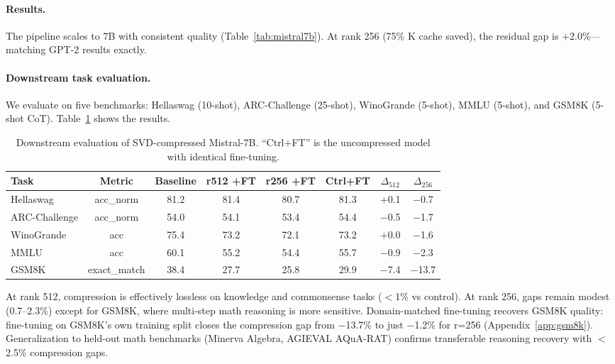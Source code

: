 \documentclass{article} %
\begin{document}
\paragraph{Results.}
The pipeline scales to 7B with consistent quality (Table~\ref{tab:mistral7b}). At rank 256 (75\% K cache saved), the residual gap is +2.0\%---matching GPT-2 results exactly.

\paragraph{Downstream task evaluation.}
We evaluate on five benchmarks: Hellaswag (10-shot), ARC-Challenge (25-shot), WinoGrande (5-shot), MMLU (5-shot), and GSM8K (5-shot CoT). Table~\ref{tab:downstream} shows the results.

\begin{table}[h]
\centering
\caption{Downstream evaluation of SVD-compressed Mistral-7B. ``Ctrl+FT'' is the uncompressed model with identical fine-tuning.}
\label{tab:downstream}
\begin{tabular}{lccccccc}
\toprule
Task & Metric & Baseline & r512 +FT & r256 +FT & Ctrl+FT & $\Delta_{512}$ & $\Delta_{256}$ \\
\midrule
Hellaswag & acc\_norm & 81.2 & 81.4 & 80.7 & 81.3 & $+$0.1 & $-$0.7 \\
ARC-Challenge & acc\_norm & 54.0 & 54.1 & 53.4 & 54.4 & $-$0.5 & $-$1.7 \\
WinoGrande & acc & 75.4 & 73.2 & 72.1 & 73.2 & $+$0.0 & $-$1.6 \\
MMLU & acc & 60.1 & 55.2 & 54.4 & 55.7 & $-$0.9 & $-$2.3 \\
GSM8K & exact\_match & 38.4 & 27.7 & 25.8 & 29.9 & $-$7.4 & $-$13.7 \\
\bottomrule
\end{tabular}
\end{table}

At rank 512, compression is effectively lossless on knowledge and commonsense tasks ($<$1\% vs control). At rank 256, gaps remain modest (0.7--2.3\%) except for GSM8K, where multi-step math reasoning is more sensitive. Domain-matched fine-tuning recovers GSM8K quality: fine-tuning on GSM8K's own training split closes the compression gap from $-$13.7\% to just $-$1.2\% for r=256 (Appendix~\ref{app:gsm8k}). Generalization to held-out math benchmarks (Minerva Algebra, AGIEVAL AQuA-RAT) confirms transferable reasoning recovery with $<$2.5\% compression gaps.
\end{document}
